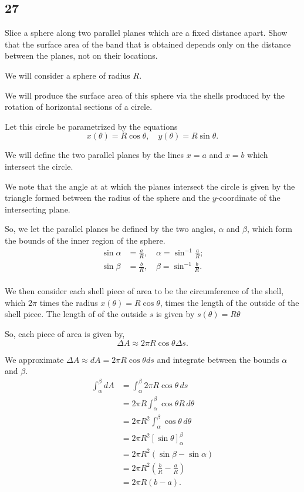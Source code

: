 \documentclass[../hw10]{subfiles}
\begin{document}
\subsection*{27}
Slice a sphere along two parallel planes which are a fixed distance apart. Show that the surface area of the band that is obtained depends only on the distance between the planes, not on their locations.

We will consider a sphere of radius $R$.

We will produce the surface area of this sphere via the shells produced by the rotation of horizontal sections of a circle.

Let this circle be parametrized by the equations 
\[x(\theta)=R\cos{\theta}, \quad y(\theta)=R\sin{\theta}.\]

We will define the two parallel planes by the lines $x=a$ and $x=b$ which intersect the circle. 

We note that the angle at at which the planes intersect the circle is given by the triangle formed between the radius of the sphere and the $y$-coordinate of the intersecting plane. 

So, we let the parallel planes be defined by the two angles, $\alpha$ and $\beta$, which form the bounds of the inner region of the sphere.
\begin{align*}
    \sin{\alpha}&=\frac{a}{R}, \quad \alpha=\sin^{-1}{\frac{a}{R}}; \\
    \sin{\beta}&=\frac{b}{R}, \quad \beta=\sin^{-1}{\frac{b}{R}}. \\
\end{align*}

We then consider each shell piece of area to be the circumference of the shell, which $2\pi$ times the radius $x(\theta)=R\cos{\theta}$, times the length of the outside of the shell piece. The length of of the outside $s$ is given by $s(\theta)=R\theta$

So, each piece of area is given by,
\[\Delta A \approx 2\pi R\cos{\theta} \Delta s.\]

We approximate $\Delta A \approx dA = 2\pi R \cos{\theta} ds$ and integrate between the bounds $\alpha$ and $\beta$.
\begin{align*}
    \int_{\alpha}^{\beta} dA &= \int_{\alpha}^{\beta} 2\pi R \cos{\theta} \, ds \\
    &= 2\pi R \int_{\alpha}^{\beta} \cos{\theta} R \, d\theta \\
    &= 2\pi R^2 \int_{\alpha}^{\beta} \cos{\theta}\, d\theta \\
    &= 2\pi R^2 {[\sin{\theta}]}_{\alpha}^{\beta} \\
    &= 2\pi R^2 (\sin{\beta}-\sin{\alpha}) \\
    &= 2\pi R^2 \left( \frac{b}{R} - \frac{a}{R} \right) \\
    &= 2\pi R (b-a). \\
\end{align*}
\end{document}

